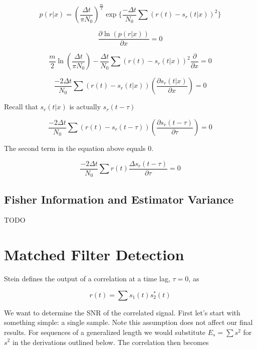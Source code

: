 \documentclass[11pt]{article}
\begin{document}
\begin{equation}
p(r|x) = \left( \frac{\Delta t}{\pi N_0}\right)^{\frac{m}{2}}
\exp \{ \frac{-\Delta t}{N_0} \sum (r(t) - s_r(t|x))^2\}
\end{equation}

\begin{equation}
\frac{\partial \ln (p(r|x))}
{\partial x}
= 0
\end{equation}

\begin{equation}
\frac{m}{2}
\ln \left( \frac{\Delta t}{\pi N_0} \right)
-
\frac{\Delta t}{N_0}
\sum (r(t) - s_r(t|x))^2
\frac{\partial}{\partial x}
= 0
\end{equation}

\begin{equation}
\frac{-2 \Delta t}{N_0}
\sum (r(t) - s_r(t|x))
\left( \frac{\partial s_r(t|x)}{\partial x} \right) = 0
\end{equation}

Recall that $s_r(t|x)$ is actually $s_r(t-\tau)$

\begin{equation}
\frac{-2 \Delta t}{N_0}
\sum (r(t) - s_r(t-\tau))
\left( \frac{\partial s_r(t-\tau)}{\partial \tau} \right) = 0
\end{equation}

The second term in the equation above equals $0$.

\begin{equation}
\frac{-2 \Delta t}{N_0}
\sum r(t) \frac{\Delta s_r(t-\tau)}{\partial \tau}
= 0
\end{equation}

\subsection{Fisher Information and Estimator Variance}

TODO


\section{Matched Filter Detection}

Stein defines the output of a correlation at a time lag, $\tau=0$, as

\begin{equation}
r(t) = \sum s_1(t)s^{*}_2(t)
\end{equation}


We want to determine the SNR of the correlated signal. First let's start with something simple: a single sample. Note this assumption does not affect our final results. For sequences of a generalized length we would substitute $E_s = \sum s^2$ for $s^2$ in the derivations outlined below. The correlation then becomes
\end{document}
